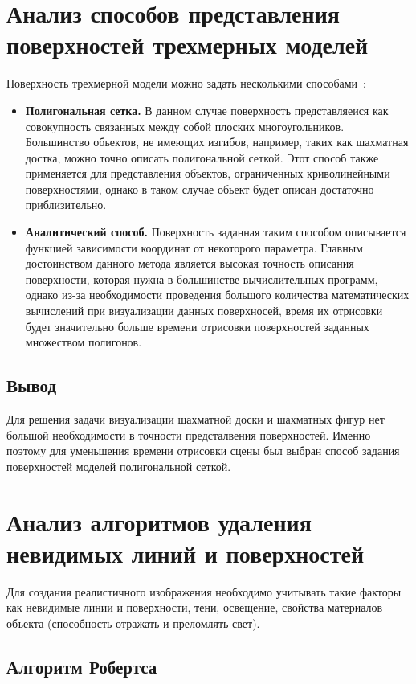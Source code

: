 \section{Анализ способов представления поверхностей трехмерных моделей}
Поверхность трехмерной модели можно задать несколькими способами~\cite{deymin}:
\begin{itemize}
	\item \textbf{Полигональная сетка.} В данном случае поверхность представляеися как совокупность связанных между собой плоских многоугольников. Большинство обьектов, не имеющих изгибов, например, таких как шахматная достка, можно точно описать полигональной сеткой. Этот способ также применяется для представления объектов, ограниченных криволинейными
	поверхностями, однако в таком случае обьект будет описан достаточно приблизительно.
	
	\item \textbf{Аналитический способ.} Поверхность заданная таким способом описывается функцией зависимости координат от некоторого параметра. Главным достоинством данного метода является высокая точность описания поверхности, которая нужна в большинстве вычислительных программ, однако из-за необходимости проведения большого количества математических вычислений при визуализации данных поверхносей, время их отрисовки будет значительно больше времени отрисовки поверхностей заданных множеством полигонов.
\end{itemize}

\subsection*{Вывод}
Для решения задачи визуализации шахматной доски и шахматных фигур нет большой необходимости в точности предсталвения поверхностей. Именно поэтому для уменьшения времени отрисовки сцены был выбран способ задания поверхностей моделей полигональной сеткой.

\clearpage
\section{Анализ алгоритмов удаления невидимых линий и поверхностей}
Для создания реалистичного изображения необходимо учитывать такие факторы как невидимые линии и поверхности, тени, освещение, свойства материалов объекта (способность отражать и преломлять свет).

\subsection{Алгоритм Робертса}

